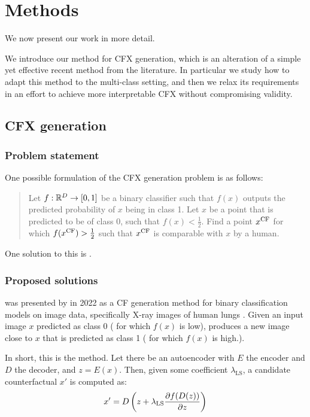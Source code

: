 \documentclass[../main.tex]{subfiles}
\begin{document}
\chapter{Methods}
\label{ch:methods}

We now present our work in more detail.

We introduce our method for CFX generation, which is an alteration of a simple yet effective recent method from the literature.
In particular we study how to adapt this method to the multi-class setting, and then
we relax its requirements in an effort to achieve more interpretable CFX without compromising validity.

\section{CFX generation}

\subsection{Problem statement}

One possible formulation of the CFX generation problem is as follows:
\begin{quote}
Let $f: \mathbb{R}^D \to [0, 1]$ be a binary classifier such that $f(x)$ outputs the predicted probability of $x$ being in class 1.
Let $x$ be a point that is predicted to be of class 0, \ie{} such that $f(x) < \frac{1}{2}$.
Find a point $x^\mathrm{CF}$ for which $f(x^\mathrm{CF}) > \frac{1}{2}$ such that $x^\mathrm{CF}$ is comparable with $x$ by a human.
\end{quote}

One solution to this is \ls{}.

\subsection{Proposed solutions}
\label{methods:0_sols}

\ls{} was presented by \citeauthor{cohenGifsplanation2022} in 2022 as a CF generation method for binary classification models on image data, specifically X-ray images of human lungs \cite{cohenGifsplanation2022}.
Given an input image $x$ predicted as class 0 (\ie{} for which $f(x)$ is low), \ls{} produces a new image close to $x$ that is predicted as class 1 (\ie{} for which $f(x)$ is high.).

In short, this is the method.
Let there be an autoencoder with $E$ the encoder and $D$ the decoder, and $z = E(x)$.
Then, given some coefficient $\lambda_\text{LS}$, a candidate counterfactual $x'$ is computed as:
\begin{align*}
    x' = D \left( z + \lambda_\text{LS} \frac{\partial f(D(z))}{\partial z} \right)
\end{align*}
\end{document}
